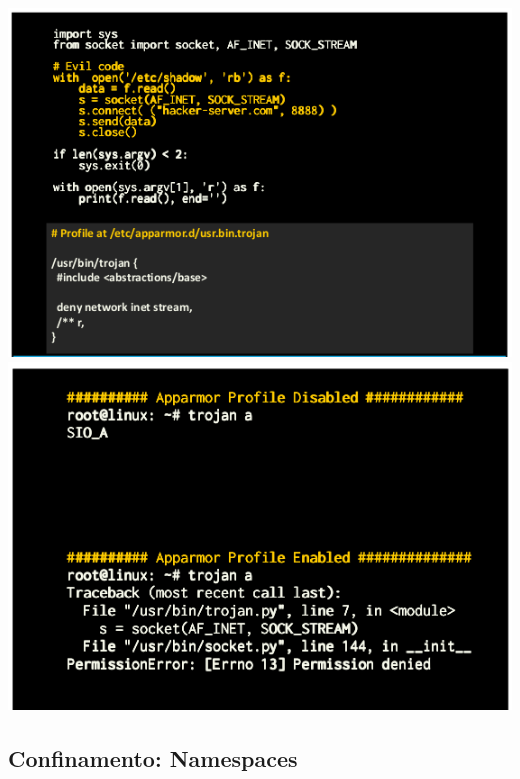 \documentclass{article}
\begin{document}
\begin{center}
  \includegraphics[scale=0.35]{41}
  \includegraphics[scale=0.35]{42}
\end{center}

\subsection{Confinamento: Namespaces}
\end{document}
